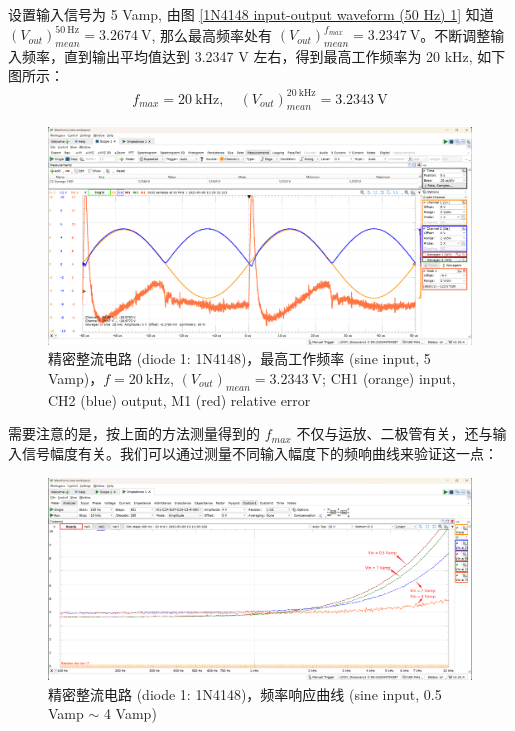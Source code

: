 \documentclass[UTF8]{article}
\begin{document}
设置输入信号为 5 Vamp, 由图 \ref{1N4148 input-output waveform (50 Hz) 1} 知道 $(V_{out})_{mean}^{\mathrm{50\ Hz}} = 3.2674 \ \mathrm{V}$, 那么最高频率处有 $(V_{out})_{mean}^{f_{max}} = 3.2347 \ \mathrm{V}$。不断调整输入频率，直到输出平均值达到 3.2347 V 左右，得到最高工作频率为 20 kHz, 如下图所示：
\begin{gather}
f_{max} = 20 \ \mathrm{kHz},\quad (V_{out})_{mean}^{20 \ \mathrm{kHz}} = 3.2343 \ \mathrm{V}
\end{gather}\vspace*{-7mm}
\begin{figure}[H]\centering
    \includegraphics[width=\columnwidth]{LCE-05-精密整流/assets/1N4148/1N4148 input-output waveform (max 20 kHz) with error and mean.png}
    \caption{精密整流电路 (diode 1: 1N4148)，最高工作频率 (sine input, 5 Vamp)，$f = 20 \ \mathrm{kHz}$, $(V_{out})_{mean} = 3.2343 \ \mathrm{V}$; CH1 (orange) input, CH2 (blue) output, M1 (red) relative error}
\end{figure}



\vspace*{-3mm}
需要注意的是，按上面的方法测量得到的 $f_{max}$ 不仅与运放、二极管有关，还与输入信号幅度有关。我们可以通过测量不同输入幅度下的频响曲线来验证这一点：
\vspace*{-7mm}
\begin{figure}[H]\centering
    \includegraphics[width=\columnwidth]{LCE-05-精密整流/assets/1N4148/1N4148 frequency response.png}
    \caption{精密整流电路 (diode 1: 1N4148)，频率响应曲线 (sine input, 0.5 Vamp $\sim$ 4 Vamp)}
\end{figure}
\end{document}
